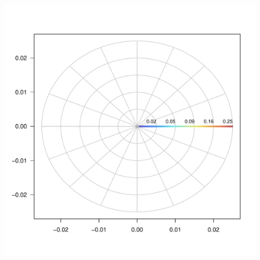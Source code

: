 \documentclass{tufte-handout}\usepackage[]{graphicx}\usepackage[]{xcolor}
\makeatletter
\def\maxwidth{ %
  \ifdim\Gin@nat@width>\linewidth
    \linewidth
  \else
    \Gin@nat@width
  \fi
}
\newenvironment{knitrout}{}{} %
\makeatother
\begin{document}
\begin{figure}[h]
\begin{knitrout}
\color{fgcolor}
\includegraphics[width=\maxwidth]{figure/circleplot-1} 
\end{knitrout}
\end{figure}








\end{document}
